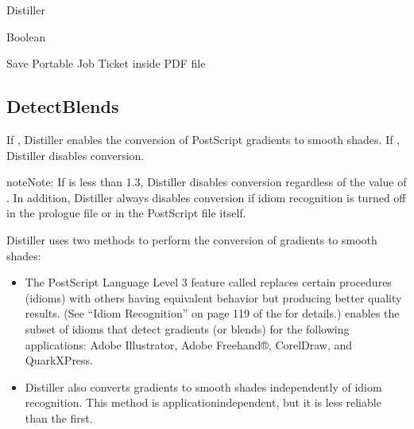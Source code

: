 \documentclass[letterpaper,12pt,english,openany,oneside]{sphinxmanual}
\begin{document}
Distiller

\label{\detokenize{PDF_Create_CommonSettings:type-90}}

Boolean

\label{\detokenize{PDF_Create_CommonSettings:ui-name-74}}

Save Portable Job Ticket inside PDF file

\label{\detokenize{PDF_Create_CommonSettings:default-value-85}}

\begin{sphinxVerbatim}[commandchars=\\\{\}]
\end{sphinxVerbatim}




\subsection{DetectBlends}
\label{\detokenize{PDF_Create_CommonSettings:detectblends}}
If  , Distiller enables the conversion of PostScript gradients to smooth shades. If  , Distiller disables conversion.

\begin{sphinxadmonition}{note}{Note:}
If  is less than 1.3, Distiller disables conversion regardless of the value of  . In addition, Distiller always disables conversion if idiom recognition is turned off in the prologue file or in the PostScript file itself.
\end{sphinxadmonition}

Distiller uses two methods to perform the conversion of gradients to smooth shades:
\begin{itemize}
\item {} 
The PostScript Language Level 3 feature called  replaces certain procedures (idioms) with others having equivalent behavior but producing better quality results. (See “Idiom Recognition” on page 119 of the  for details.)  enables the subset of idioms that detect gradients (or blends) for the following applications: Adobe Illustrator, Adobe Freehand®, CorelDraw, and QuarkXPress.

\item {} 
Distiller also converts gradients to smooth shades independently of idiom recognition. This method is application\sphinxhyphen{}independent, but it is less reliable than the first.

\end{itemize}
\end{document}
